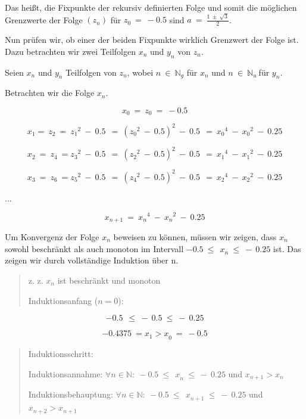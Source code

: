 \documentclass[a4paper, 12pt]{book}
\begin{document}
\begin{longtable}[]
\begin{minipage}[b]{\linewidth}
Das heißt, die Fixpunkte der rekursiv definierten Folge und somit die
möglichen Grenzwerte der Folge \(\left( z_{n} \right)\) für
\(z_{0}\  = \  - 0.5\) sind \(a\  = \ \frac{1\  \pm \ \sqrt{3}}{2}\).

Nun prüfen wir, ob einer der beiden Fixpunkte wirklich Grenzwert der
Folge ist. Dazu betrachten wir zwei Teilfolgen \(x_{n}\) und \(y_{n}\)
von \(z_{n}\).

Seien \(x_{n}\) und \(y_{n}\) Teilfolgen von \(z_{n}\), wobei
\(n\  \in \ \mathbb{N}_{g}\) für \(x_{n}\) und
\(n\  \in \ \mathbb{N}_{u}\ \)für \(y_{n}\).

Betrachten wir die Folge \(x_{n}\).

\[x_{0}\  = \ z_{0}\  = \  - 0.5\]

\[x_{1}{= \ z}_{2}\  = \ {z_{1}}^{2}\  - \ 0.5\ \  = \ ({z_{0}}^{2}\  - \ 0.5)^{2}\  - \ 0.5\ \  = \ {x_{0}}^{4}\  - \ {x_{0}}^{2}\  - \ 0.25\]

\[x_{2}\  = \ z_{4}\  = {z_{3}}^{2}\  - \ 0.5\ \  = \ ({z_{2}}^{2}\  - \ 0.5)^{2}\  - \ 0.5\ \  = \ {x_{1}}^{4}\  - \ {x_{1}}^{2}\  - \ 0.25\]

\[x_{3}\  = \ z_{6}\  = {z_{5}}^{2}\  - \ 0.5\ \  = \ ({z_{4}}^{2}\  - \ 0.5)^{2}\  - \ 0.5\ \  = \ {x_{2}}^{4}\  - \ {x_{2}}^{2}\  - \ 0.25\]

...

\[x_{n + 1}\  = \ {x_{n}}^{4}\  - \ {x_{n}}^{2}\  - \ 0.25\]

Um Konvergenz der Folge \(x_{n}\) beweisen zu können, müssen wir zeigen,
dass \(x_{n}\) sowohl beschränkt als auch monoton im Intervall
\(- 0.5\ {\leq \ \ x}_{n}\  \leq \  - \ 0.25\) ist. Das zeigen wir durch
vollständige Induktion über n.

\begin{quote}
z. z. \(x_{n}\) ist beschränkt und monoton

Induktionsanfang (\(n = 0\)):
\end{quote}

\[- 0.5\ \  \leq \  - \ 0.5\  \leq \  - \ 0.25\]

\[{{- 0.4375\  = x}_{1} > x}_{0}\  = \  - 0.5\]

\begin{quote}
Induktionsschritt:

Induktionsannahme:
\(\forall n \in \mathbb{N:\ } - 0.5\ {\leq \ \ x}_{n}\  \leq \  - \ 0.25\)
und \(x_{n + 1} > x_{n}\)

Induktionsbehauptung:
\(\forall n \in \mathbb{N:\ } - 0.5\ {\leq \ \ x}_{n + 1}\  \leq \  - \ 0.25\)
und \(x_{n + 2} > x_{n + 1}\)
\end{quote}


\end{minipage}
\end{longtable}
\end{document}
